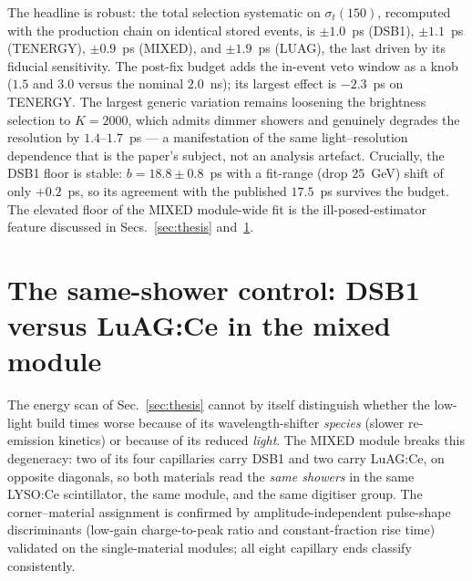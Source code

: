 \documentclass[final,5p,times,twocolumn]{elsarticle}
\begin{document}
The headline is robust: the total selection systematic on $\sigma_t(150)$,
recomputed with the production chain on identical stored events, is $\pm1.0$~ps (DSB1),
$\pm1.1$~ps (TENERGY), $\pm0.9$~ps (MIXED), and $\pm1.9$~ps (LUAG), the last driven by
its fiducial sensitivity. The post-fix budget adds the in-event veto window as a knob
($1.5$ and $3.0$ versus the nominal $2.0$~ns); its largest effect is $-2.3$~ps on
TENERGY. The largest generic variation remains loosening the brightness selection to
$K=2000$, which admits dimmer showers and genuinely degrades the resolution by
$1.4$--$1.7$~ps --- a manifestation of the same light--resolution dependence that is
the paper's subject, not an analysis artefact. Crucially, the DSB1 floor is stable:
$b=18.8\pm0.8$~ps with a fit-range (drop $25$~GeV) shift of only $+0.2$~ps, so its
agreement with the published $17.5$~ps survives the budget. The elevated floor of the
MIXED module-wide fit is the ill-posed-estimator feature discussed in
Secs.~\ref{sec:thesis} and~\ref{sec:mixed}.



\section{The same-shower control: DSB1 versus LuAG:Ce in the mixed module}
\label{sec:mixed}

The energy scan of Sec.~\ref{sec:thesis} cannot by itself distinguish whether the
low-light build times worse because of its wavelength-shifter \emph{species} (slower
re-emission kinetics) or because of its reduced \emph{light}. The MIXED module breaks
this degeneracy: two of its four capillaries carry DSB1 and two carry LuAG:Ce, on
opposite diagonals, so both materials read the \emph{same showers} in the same LYSO:Ce
scintillator, the same module, and the same digitiser group. The corner--material
assignment is confirmed by amplitude-independent pulse-shape discriminants
(low-gain charge-to-peak ratio and constant-fraction rise time) validated on the
single-material modules; all eight capillary ends classify consistently.
\end{document}
